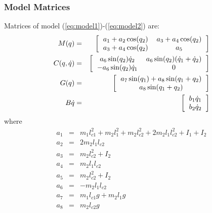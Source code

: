 \documentclass[9pt,spanish,aspectratio=1610]{beamer}
\begin{document}
\begin{frame}\frametitle{Model Matrices}
  Matrices of model (\ref{eq:model1})-(\ref{eq:model2}) are:
  \begin{eqnarray*}
    M(q) &=& \left[\begin{tabular}{cc}
                   $a_1 + a_2\cos (q_2)$ & $a_3 + a_4\cos (q_2)$\\
                   $a_3 + a_4\cos (q_2)$ & $a_5$
    \end{tabular}\right]
\\
    C(q,\dot{q}) &=& \left[\begin{tabular}{cc}
                   $a_6\sin(q_2)\dot{q}_2$ & $a_6\sin(q_2)(\dot{q}_1 + \dot{q}_2)$\\
                   $-a_6\sin(q_2)\dot{q}_1$ & $0$
    \end{tabular}\right]
\\
    G(q) &=& \left[\begin{tabular}{c}
                   $a_7\sin(q_1) + a_8\sin(q_1 + q_2)$\\
                   $a_8\sin(q_1 + q_2)$
                 \end{tabular}\right]
\\
    B\dot{q}&=& \left[\begin{tabular}{c}
                   $b_1\dot{q}_1$\\
                   $b_2\dot{q}_2$
    \end{tabular}\right]
\end{eqnarray*}
where
\begin{eqnarray*}
  a_1 &=& m_1 l_{c1}^2 + m_2 l_1^2 + m_2 l_{c2}^2 + 2m_2 l_1 l_{c2}^2 + I_1 + I_2 \\
  a_2 &=& 2m_2 l_1 l_{c2}\\
  a_3 &=& m_2 l_{c2}^2 + I_2\\
  a_4 &=& m_2 l_1 l_{c2}\\
  a_5 &=& m_2 l_{c2}^2 + I_2\\
  a_6 &=& -m_2 l_1 l_{c2}\\
  a_7 &=& m_1 l_{c1} g + m_2 l_1 g\\
  a_8 &=& m_2 l_{c2} g
\end{eqnarray*}

\end{frame}
\end{document}
